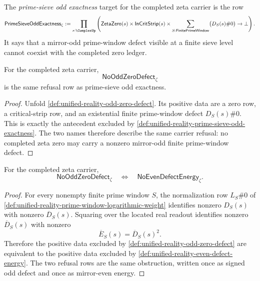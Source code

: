 \begin{definition}
\label{def:unified-reality-prime-sieve-odd-exactness}
The \emph{prime-sieve odd exactness} target for the completed zeta carrier
is the row
$$
\mathsf{PrimeSieveOddExactness}_{\zeta}
:=
\prod_{s:\ComplexUp}
\left(
\mathsf{ZetaZero}(s)
\times
\mathsf{InCritStrip}(s)
\times
\sum_{S:\mathsf{FinitePrimeWindow}}
\bigl(D_S(s)\#0\bigr)
\to
\bot
\right).
$$
It says that a mirror-odd prime-window defect visible at a finite sieve
level cannot coexist with the completed zero ledger.
\end{definition}

\begin{theorem}
\label{thm:unified-reality-no-odd-zero-defect-prime-sieve-odd-exactness}
For the completed zeta carrier,
$$
\mathsf{NoOddZeroDefect}_{\zeta}
$$
is the same refusal row as prime-sieve odd exactness.
\end{theorem}

\begin{proof}
Unfold
\autoref{def:unified-reality-odd-zero-defect}.  Its positive data are a
zero row, a critical-strip row, and an existential finite prime-window
defect $D_S(s)\#0$.  This is exactly the antecedent excluded by
\autoref{def:unified-reality-prime-sieve-odd-exactness}.  The two names
therefore describe the same carrier refusal: no completed zeta zero may
carry a nonzero mirror-odd finite prime-window defect.
\end{proof}

\begin{theorem}
\label{thm:unified-reality-odd-defect-refusal-even-energy-refusal}
For the completed zeta carrier,
$$
\mathsf{NoOddZeroDefect}_{\zeta}
\quad\Longleftrightarrow\quad
\mathsf{NoEvenDefectEnergy}_{\zeta}.
$$
\end{theorem}

\begin{proof}
For every nonempty finite prime window $S$, the normalization row
$L_S\#0$ of
\autoref{def:unified-reality-prime-window-logarithmic-weight} identifies
nonzero $D_S(s)$ with nonzero $\overline D_S(s)$.  Squaring over the
located real readout identifies nonzero $\overline D_S(s)$ with nonzero
$$
\overline E_S(s)=\overline D_S(s)^2.
$$
Therefore the positive data excluded by
\autoref{def:unified-reality-odd-zero-defect} are equivalent to the
positive data excluded by
\autoref{def:unified-reality-even-defect-energy}.  The two refusal rows
are the same obstruction, written once as signed odd defect and once as
mirror-even energy.
\end{proof}


